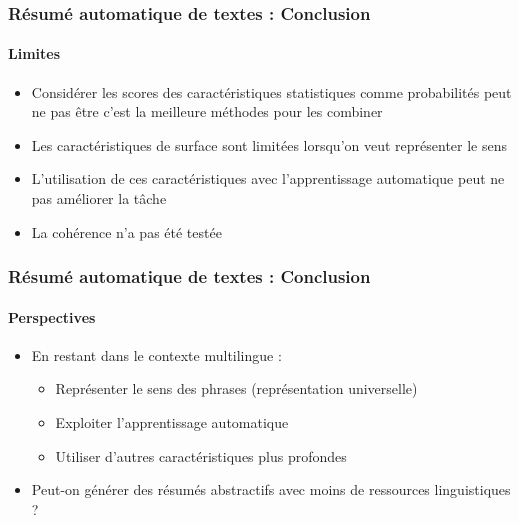 \documentclass[xcolor=table]{beamer}
\begin{document}
\begin{frame}
	\frametitle{Résumé automatique de textes : Conclusion}
	\framesubtitle{Limites}
	
	\begin{itemize}
		\item Considérer les scores des caractéristiques statistiques comme probabilités peut ne pas être c'est la meilleure méthodes pour les combiner
		\item Les caractéristiques de surface sont limitées lorsqu'on veut représenter le sens
		\item L'utilisation de ces caractéristiques avec l'apprentissage automatique peut ne pas améliorer la tâche
		\item La cohérence n'a pas été testée
	\end{itemize}
	
\end{frame}

\begin{frame}
\frametitle{Résumé automatique de textes : Conclusion}
\framesubtitle{Perspectives}
	
\begin{itemize}
	\item En restant dans le contexte multilingue :
	\begin{itemize}
		\item Représenter le sens des phrases (représentation universelle)
		\item Exploiter l'apprentissage automatique 
		\item Utiliser d'autres caractéristiques plus profondes
	\end{itemize}
	\item  Peut-on générer des résumés abstractifs avec moins de ressources linguistiques ?
\end{itemize}
	
\end{frame}
\end{document}

